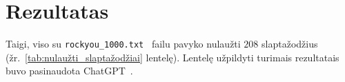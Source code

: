 \section{Rezultatas}
\label{sec:Rezultatas}

Taigi, viso su \texttt{rockyou\_1000.txt}~\cite{VMA} failu pavyko nulaužti $208$ slaptažodžius (žr.~\ref{tab:nulaužti_slaptažodžiai} lentelę). Lentelę užpildyti turimais rezultatais buvo pasinaudota ChatGPT~\cite{chatgpt_bendrai}.


